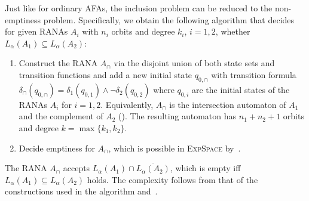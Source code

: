 \documentclass[10pt,a4paper]{amsart}
\theoremstyle{definition}
\newcommand{\seq}{\subseteq}
\newcommand{\set}[1]{\{#1\}}
\newcommand{\EXPSPACE}{\textsc{ExpSpace}\xspace}
\begin{document}
\begin{IEEEproof}

Just like for ordinary AFAs, the inclusion problem can be reduced to the non-emptiness problem. Specifically, we obtain the following algorithm that decides for given RANAs $A_i$ with $n_i$ orbits and degree $k_i$, $i = 1,2$, whether {$L_\alpha(A_1) \seq L_\alpha(A_2)$}:
  \begin{enumerate}
    \item Construct the RANA $A_{\cap}$ via the disjoint union of both state sets and
      transition functions and add a new initial state $q_{0,\cap}$ with transition formula
      $\delta_{\cap}(q_{0,\cap}) = \delta_1(q_{0,1}) \wedge \neg\delta_2(q_{0,2})$ where
      $q_{0,i}$ are the initial states of the RANAs $A_i$ for $i = 1,2$. Equivalently, $A_{\cap}$ is the intersection automaton of $A_1$ and the complement of $A_2$ ().
      The resulting automaton has $n_1 + n_2 + 1$ orbits and degree $k = \max\set{k_1,k_2}$.
    \item Decide emptiness for $A_{\cap}$, which is possible in
      \EXPSPACE by~.
  \end{enumerate}

The RANA $A_\cap$ accepts $L_{\alpha}(A_1) \cap \overline{L_{\alpha}(A_2)}$, which is empty iff $L_{\alpha}(A_1) \seq L_{\alpha}(A_2)$ holds. The complexity follows from that of the constructions used in the algorithm and~.
\end{IEEEproof}
\endgroup
\end{document}
